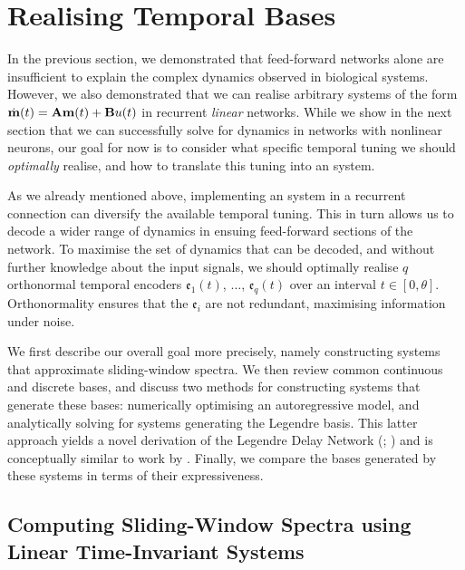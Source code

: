
\section{Realising Temporal Bases}
\label{sec:temporal_bases}

\newcommand{\cPos}[1]{\textbf{\textcolor{DarkBlue}{#1}}}
\newcommand{\cNeg}[1]{\textbf{\textcolor{DarkRed}{#1}}}

In the previous section, we demonstrated that feed-forward networks alone are insufficient to explain the complex dynamics observed in biological systems.
However, we also demonstrated that we can realise arbitrary \LTI systems of the form $\dot{\mathbf{m}}(t) = \mathbf{A} \mathbf{m}(t) + \mathbf{B} u(t)$ in recurrent \emph{linear} networks.
While we show in the next section that we can successfully solve for dynamics in networks with nonlinear neurons, our goal for now is to consider what specific temporal tuning we should \emph{optimally} realise, and how to translate this tuning into an \LTI system.

As we already mentioned above, implementing an \LTI system in a recurrent connection can diversify the available temporal tuning.
This in turn allows us to decode a wider range of dynamics in ensuing feed-forward sections of the network.
To maximise the set of dynamics that can be decoded, and without further knowledge about the input signals, we should optimally realise $q$ orthonormal temporal encoders $\mathfrak{e}_1(t)$, $\ldots$, $\mathfrak{e}_q(t)$ over an interval $t \in [0, \theta]$.
Orthonormality ensures that the $\mathfrak{e}_i$ are not redundant, maximising information under noise.

We first describe our overall goal more precisely, namely constructing \LTI systems that approximate sliding-window spectra.
We then review common continuous and discrete bases, and discuss two methods for constructing \LTI systems that generate these bases: numerically optimising an autoregressive model, and analytically solving for \LTI systems generating the Legendre basis.
This latter approach yields a novel derivation of the Legendre Delay Network (\LDN; \cite{voelker2018improving}) and is conceptually similar to work by \citet{gu2020hippo}.
Finally, we compare the bases generated by these systems in terms of their expressiveness.

\subsection{Computing Sliding-Window Spectra using Linear Time-Invariant Systems}
\label{sec:sliding_window_lti}

